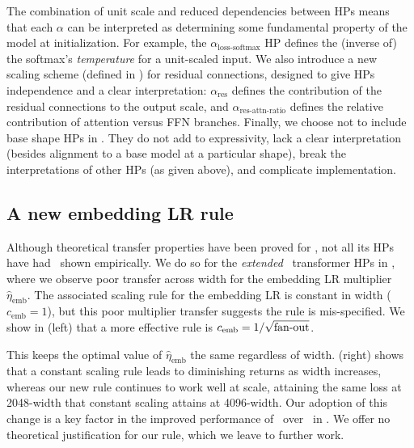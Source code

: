 The combination of unit scale and reduced dependencies between HPs means that each $\alpha$ can be interpreted as determining some fundamental property of the model at initialization. For example, the $\alpha_\mathrm{loss\text{-}softmax}$ HP defines the (inverse of) the softmax's \textit{temperature} for a unit-scaled input. We also introduce a new scaling scheme (defined in ) for residual connections, designed to give HPs independence and a clear interpretation: $\alpha_\mathrm{res}$ defines the contribution of the residual connections to the output scale, and $\alpha_\mathrm{res\text{-}attn\text{-}ratio}$ defines the relative contribution of attention versus FFN branches.
Finally, we choose not to include base shape HPs in \umup. They do not add to expressivity, lack a clear interpretation (besides alignment to a base model at a particular shape), break the interpretations of other HPs (as given above), and complicate implementation.

\subsection{A new embedding LR rule} \label{sec:umup:emb_lr_rule}

Although theoretical transfer properties have been proved for \mup, not all its HPs have had \mut\ shown empirically. We do so for the \textit{extended} \mup\ transformer HPs in , where we observe poor transfer across width for the embedding LR multiplier $\hat{\eta}_\mathrm{emb}$. The associated scaling rule for the embedding LR is constant in width ($c_\mathrm{emb} = 1$), but this poor multiplier transfer suggests the rule is mis-specified. We show in  (left) that a more effective rule is $c_\mathrm{emb} = 1 / \sqrt{\mathrm{fan{\text -}out}}$. 

This keeps the optimal value of $\hat{\eta}_\mathrm{emb}$ the same regardless of width.  (right) shows that a constant scaling rule leads to diminishing returns as width increases, whereas our new rule continues to work well at scale, attaining the same loss at 2048-width that constant scaling attains at 4096-width.
Our adoption of this change is a key factor in the improved performance of \umup\ over \mup\ in . 
We offer no theoretical justification for our rule, which we leave to further work.

